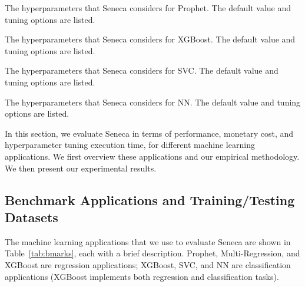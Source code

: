 
\begin{table}[t]
\centering

\caption{Machine learning applications used as benchmarks
to evaluate Seneca. 
\label{tab:bmarks}}
\end{table}

\begin{table}[t]
\centering

\caption{The hyperparameters that Seneca considers for Prophet. 
The default value and tuning options are listed. 
\label{tab:prophet_para}}
\end{table}

\begin{table}[t]
\centering

\caption{The hyperparameters that Seneca considers for XGBoost. 
The default value and tuning options are listed. 
\label{tab:xgboost_para}}
\end{table}

\begin{table}[t]
\centering

\caption{The hyperparameters that Seneca considers for SVC. 
The default value and tuning options are listed. 
\label{tab:svc_para}}
\end{table}

\begin{table}[t]
\centering

\caption{The hyperparameters that Seneca considers for NN.
The default value and tuning options are listed. 
\label{tab:nn_para}}
\vspace{-0.2in}
\end{table}

In this section,
we evaluate Seneca in terms of performance, monetary cost, 
and hyperparameter tuning execution time, 
for different machine learning applications.
We first overview these applications and our empirical methodology. 
We then present our experimental results. 

\subsection{Benchmark Applications and Training/Testing  Datasets}
The machine learning applications that we use to evaluate Seneca 
are shown in Table~\ref{tab:bmarks}, each with 
a brief description.  Prophet, Multi-Regression, and XGBoost are regression
applications; XGBoost, SVC, and NN are classification applications (XGBoost 
implements both regression and classification tasks).

